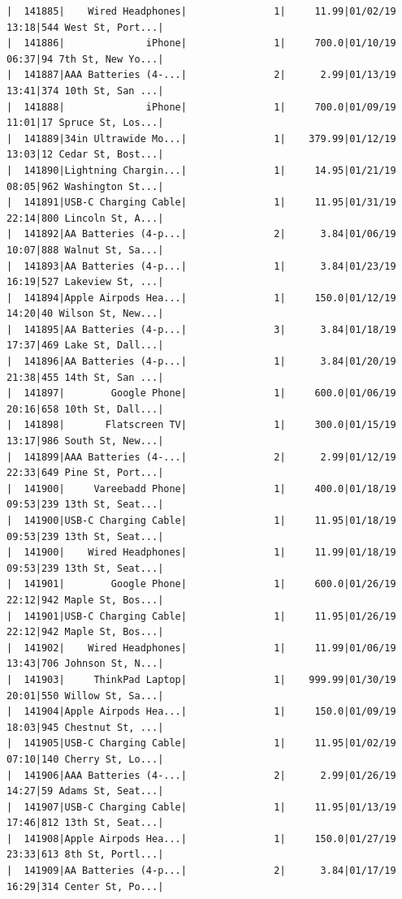 \documentclass[
  letterpaper,
  DIV=11,
  numbers=noendperiod]{scrartcl}
\begin{document}
\begin{verbatim}
|  141885|    Wired Headphones|               1|     11.99|01/02/19 13:18|544 West St, Port...|
|  141886|              iPhone|               1|     700.0|01/10/19 06:37|94 7th St, New Yo...|
|  141887|AAA Batteries (4-...|               2|      2.99|01/13/19 13:41|374 10th St, San ...|
|  141888|              iPhone|               1|     700.0|01/09/19 11:01|17 Spruce St, Los...|
|  141889|34in Ultrawide Mo...|               1|    379.99|01/12/19 13:03|12 Cedar St, Bost...|
|  141890|Lightning Chargin...|               1|     14.95|01/21/19 08:05|962 Washington St...|
|  141891|USB-C Charging Cable|               1|     11.95|01/31/19 22:14|800 Lincoln St, A...|
|  141892|AA Batteries (4-p...|               2|      3.84|01/06/19 10:07|888 Walnut St, Sa...|
|  141893|AA Batteries (4-p...|               1|      3.84|01/23/19 16:19|527 Lakeview St, ...|
|  141894|Apple Airpods Hea...|               1|     150.0|01/12/19 14:20|40 Wilson St, New...|
|  141895|AA Batteries (4-p...|               3|      3.84|01/18/19 17:37|469 Lake St, Dall...|
|  141896|AA Batteries (4-p...|               1|      3.84|01/20/19 21:38|455 14th St, San ...|
|  141897|        Google Phone|               1|     600.0|01/06/19 20:16|658 10th St, Dall...|
|  141898|       Flatscreen TV|               1|     300.0|01/15/19 13:17|986 South St, New...|
|  141899|AAA Batteries (4-...|               2|      2.99|01/12/19 22:33|649 Pine St, Port...|
|  141900|     Vareebadd Phone|               1|     400.0|01/18/19 09:53|239 13th St, Seat...|
|  141900|USB-C Charging Cable|               1|     11.95|01/18/19 09:53|239 13th St, Seat...|
|  141900|    Wired Headphones|               1|     11.99|01/18/19 09:53|239 13th St, Seat...|
|  141901|        Google Phone|               1|     600.0|01/26/19 22:12|942 Maple St, Bos...|
|  141901|USB-C Charging Cable|               1|     11.95|01/26/19 22:12|942 Maple St, Bos...|
|  141902|    Wired Headphones|               1|     11.99|01/06/19 13:43|706 Johnson St, N...|
|  141903|     ThinkPad Laptop|               1|    999.99|01/30/19 20:01|550 Willow St, Sa...|
|  141904|Apple Airpods Hea...|               1|     150.0|01/09/19 18:03|945 Chestnut St, ...|
|  141905|USB-C Charging Cable|               1|     11.95|01/02/19 07:10|140 Cherry St, Lo...|
|  141906|AAA Batteries (4-...|               2|      2.99|01/26/19 14:27|59 Adams St, Seat...|
|  141907|USB-C Charging Cable|               1|     11.95|01/13/19 17:46|812 13th St, Seat...|
|  141908|Apple Airpods Hea...|               1|     150.0|01/27/19 23:33|613 8th St, Portl...|
|  141909|AA Batteries (4-p...|               2|      3.84|01/17/19 16:29|314 Center St, Po...|

\end{verbatim}
\end{document}
